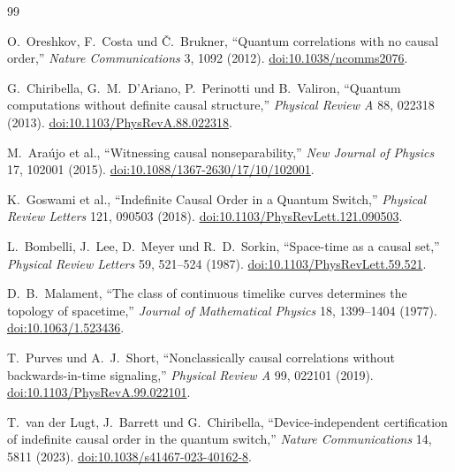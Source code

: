 \documentclass[11pt,a4paper]{article}
\begin{document}
\begin{thebibliography}{99}

O.~Oreshkov, F.~Costa und Č.~Brukner,
``Quantum correlations with no causal order,''
\emph{Nature Communications} 3, 1092 (2012).
\href{https://doi.org/10.1038/ncomms2076}{doi:10.1038/ncomms2076}.

G.~Chiribella, G.~M.~D'Ariano, P.~Perinotti und B.~Valiron,
``Quantum computations without definite causal structure,''
\emph{Physical Review A} 88, 022318 (2013).
\href{https://doi.org/10.1103/PhysRevA.88.022318}{doi:10.1103/PhysRevA.88.022318}.

M.~Araújo et al.,
``Witnessing causal nonseparability,''
\emph{New Journal of Physics} 17, 102001 (2015).
\href{https://doi.org/10.1088/1367-2630/17/10/102001}{doi:10.1088/1367-2630/17/10/102001}.

K.~Goswami et al.,
``Indefinite Causal Order in a Quantum Switch,''
\emph{Physical Review Letters} 121, 090503 (2018).
\href{https://doi.org/10.1103/PhysRevLett.121.090503}{doi:10.1103/PhysRevLett.121.090503}.

L.~Bombelli, J.~Lee, D.~Meyer und R.~D.~Sorkin,
``Space-time as a causal set,''
\emph{Physical Review Letters} 59, 521--524 (1987).
\href{https://doi.org/10.1103/PhysRevLett.59.521}{doi:10.1103/PhysRevLett.59.521}.

D.~B.~Malament,
``The class of continuous timelike curves determines the topology of
spacetime,''
\emph{Journal of Mathematical Physics} 18, 1399--1404 (1977).
\href{https://doi.org/10.1063/1.523436}{doi:10.1063/1.523436}.

T.~Purves und A.~J.~Short,
``Nonclassically causal correlations without backwards-in-time signaling,''
\emph{Physical Review A} 99, 022101 (2019).
\href{https://doi.org/10.1103/PhysRevA.99.022101}{doi:10.1103/PhysRevA.99.022101}.

T.~van der Lugt, J.~Barrett und G.~Chiribella,
``Device-independent certification of indefinite causal order in the quantum
switch,''
\emph{Nature Communications} 14, 5811 (2023).
\href{https://doi.org/10.1038/s41467-023-40162-8}{doi:10.1038/s41467-023-40162-8}.

\end{thebibliography}
\end{document}
